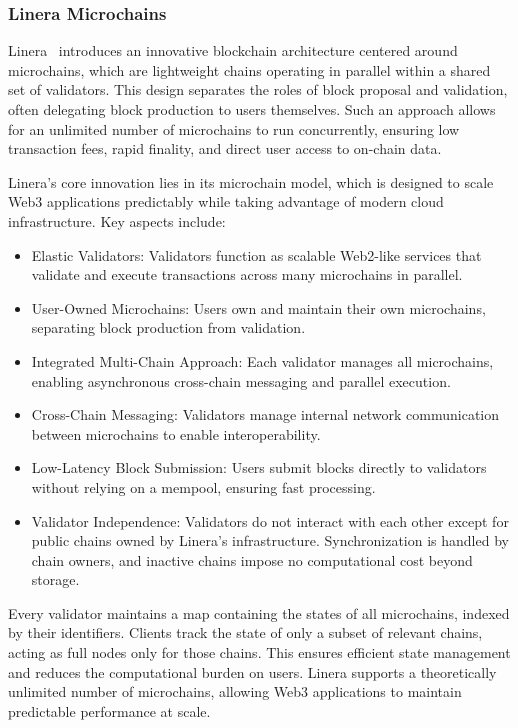 \subsubsection{Linera Microchains}

Linera~\cite{linera} introduces an innovative blockchain architecture centered around microchains, which are lightweight chains operating in parallel within a shared set of validators. This design separates the roles of block proposal and validation, often delegating block production to users themselves. Such an approach allows for an unlimited number of microchains to run concurrently, ensuring low transaction fees, rapid finality, and direct user access to on-chain data.

Linera’s core innovation lies in its microchain model, which is designed to scale Web3 applications predictably while taking advantage of modern cloud infrastructure. Key aspects include:
\begin{itemize}
    \item Elastic Validators: Validators function as scalable Web2-like services that validate and execute transactions across many microchains in parallel.
    
    \item User-Owned Microchains: Users own and maintain their own microchains, separating block production from validation.

    \item Integrated Multi-Chain Approach: Each validator manages all microchains, enabling asynchronous cross-chain messaging and parallel execution.

    \item Cross-Chain Messaging: Validators manage internal network communication between microchains to enable interoperability.

    \item Low-Latency Block Submission: Users submit blocks directly to validators without relying on a mempool, ensuring fast processing.

    \item Validator Independence: Validators do not interact with each other except for public chains owned by Linera’s infrastructure. Synchronization is handled by chain owners, and inactive chains impose no computational cost beyond storage.
\end{itemize}

Every validator maintains a map containing the states of all microchains, indexed by their identifiers. Clients track the state of only a subset of relevant chains, acting as full nodes only for those chains. This ensures efficient state management and reduces the computational burden on users.
Linera supports a theoretically unlimited number of microchains, allowing Web3 applications to maintain predictable performance at scale.

